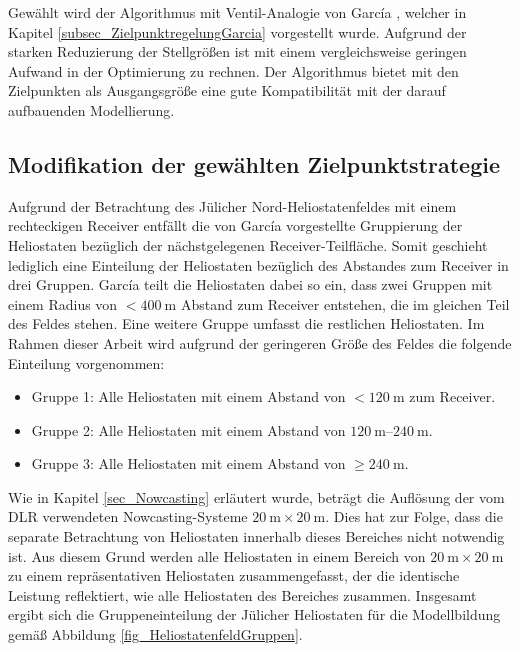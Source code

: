 Gewählt wird der Algorithmus mit Ventil-Analogie von García \cite{Garcia2}, welcher in Kapitel \ref{subsec_ZielpunktregelungGarcia} vorgestellt wurde.
Aufgrund der starken Reduzierung der Stellgrößen ist mit einem vergleichsweise geringen Aufwand in der Optimierung zu rechnen.
Der Algorithmus bietet mit den Zielpunkten als Ausgangsgröße eine gute Kompatibilität mit der darauf aufbauenden Modellierung.


\subsection{Modifikation der gewählten Zielpunktstrategie} \label{subsec_ModifikationAlgorithmus}
Aufgrund der Betrachtung des Jülicher Nord-Heliostatenfeldes mit einem rechteckigen Receiver entfällt die von García vorgestellte Gruppierung der Heliostaten bezüglich der nächstgelegenen Receiver-Teilfläche.
Somit geschieht lediglich eine Einteilung der Heliostaten bezüglich des Abstandes zum Receiver in drei Gruppen.
García teilt die Heliostaten dabei so ein, dass zwei Gruppen mit einem Radius von $< \SI{400}{\metre}$ Abstand zum Receiver entstehen, die im gleichen Teil des Feldes stehen.
Eine weitere Gruppe umfasst die restlichen Heliostaten.
Im Rahmen dieser Arbeit wird aufgrund der geringeren Größe des Feldes die folgende Einteilung vorgenommen:
\begin{itemize}
    \item Gruppe 1: Alle Heliostaten mit einem Abstand von $< \SI{120}{\metre}$ zum Receiver.
    \item Gruppe 2: Alle Heliostaten mit einem Abstand von $\SIrange{120}{240}{\metre}$.
    \item Gruppe 3: Alle Heliostaten mit einem Abstand von $\geq \SI{240}{\metre}$.
\end{itemize}

Wie in Kapitel \ref{sec_Nowcasting} erläutert wurde, beträgt die Auflösung der vom DLR verwendeten Nowcasting-Systeme $\SI{20}{\metre} \times \SI{20}{\metre}$.
Dies hat zur Folge, dass die separate Betrachtung von Heliostaten innerhalb dieses Bereiches nicht notwendig ist.
Aus diesem Grund werden alle Heliostaten in einem Bereich von $\SI{20}{\metre} \times \SI{20}{\metre}$ zu einem repräsentativen Heliostaten zusammengefasst, der die identische Leistung reflektiert, wie alle Heliostaten des Bereiches zusammen.
Insgesamt ergibt sich die Gruppeneinteilung der Jülicher Heliostaten für die Modellbildung gemäß Abbildung \ref{fig_HeliostatenfeldGruppen}.

